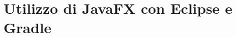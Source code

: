 \documentclass[xcolor=dvipsnames,presentation]{beamer}
\begin{document}
\section{Utilizzo di JavaFX con Eclipse e Gradle}

%
%
%
\end{document}
